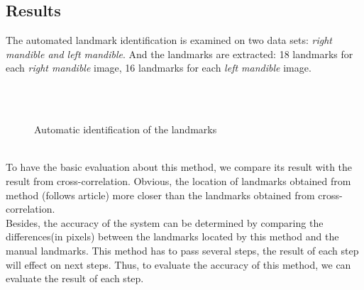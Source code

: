 \subsection{Results}
The automated landmark identification is examined on two data sets: \textit{right mandible and left mandible}. And the landmarks are extracted: 18 landmarks for each \textit{right mandible} image, 16 landmarks for each \textit{left mandible} image.\\
\begin{figure}[h!]
\centering
{}\\
~~
\caption{Automatic identification of the landmarks}
\label{fig:figure_31}
\end{figure}~\\
To have the basic evaluation about this method, we compare its result with the result from cross-correlation. Obvious, the location of landmarks obtained from method (follows article) more closer than the landmarks obtained from cross-correlation.\\
Besides, the accuracy of the system can be determined by comparing the differences(in pixels) between the landmarks located by this method and the manual landmarks. This method has to pass several steps, the result of each step will effect on next steps. Thus, to evaluate the accuracy of this method, we can evaluate the result of each step.
